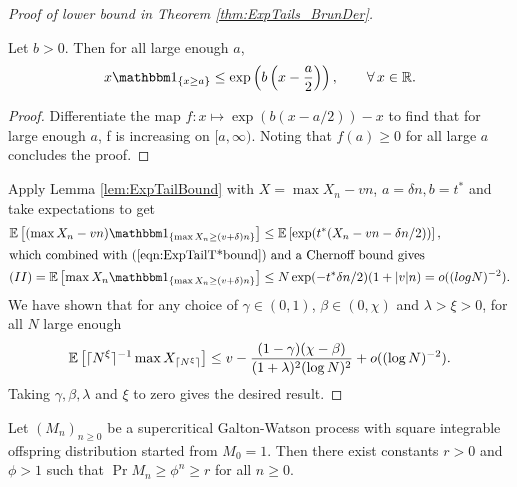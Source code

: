 \begin{proof}[Proof of lower bound in Theorem \ref{thm:ExpTails_BrunDer}]
\begin{lemma} \label{lem:ExpTailBound}
Let $b > 0$. Then for all large enough $a$, 
\begin{equation}
x \Ind_{\{x \geq a\}} \leq \exp\left(b\left(x - \frac{a}{2}\right)\right), \qquad\forall\, x \in \R. 
\end{equation}
\end{lemma}
\begin{proof}
Differentiate the map $f:x \mapsto \exp(b(x - a/2)) - x$ to find that for large enough $a$, f is increasing on $[a, \infty)$. Noting that $f(a) \geq 0$ for all large $a$ concludes the proof.  
\end{proof}
Apply Lemma \ref{lem:ExpTailBound} with $X = \max X_n - vn$, $a = \delta n, b = t^*$ and take expectations to get 
\begin{align*}
\Ex{(\max X_n - vn) \Ind_{\{\max X_n \geq (v + \delta)n\}}} &\leq \Ex{\exp(t^*(X_n - vn - \delta n / 2))}, \nonumber \\
\intertext{which combined with (\ref{eqn:ExpTailT*bound}) and a Chernoff bound gives}
(II) = \Ex{\max X_n \Ind_{\{\max X_n \geq (v + \delta)n\}}} &\leq N \exp(-t^* \delta n /2) (1 + |v|n) = o((log N)^{-2}). 
\end{align*}
We have shown that for any choice of $\gamma \in (0,1)$, $\beta \in (0, \chi)$ and $\lambda > \xi > 0$, for all $N$ large enough
\begin{equation}\label{eqn:ExpTailResultTally}
\mathbb{E}\left[ \lceil N^\xi\rceil^{-1} \max X_{\lceil N^\xi\rceil} \right] \leq v - \frac{(1 - \gamma)(\chi - \beta)}{(1 + \lambda)^2(\log N)^2} + o((\log N)^{-2}). 
\end{equation}
Taking $\gamma, \beta, \lambda$ and $\xi$ to zero gives the desired result. 
\end{proof}

\begin{lemma}\label{lem:ExpTailsGW}
Let $(M_n)_{n \geq 0}$ be a supercritical Galton-Watson process with square integrable offspring distribution started from $M_0 = 1$. Then there exist constants $r > 0$ and $\phi > 1$ such that $\Pr{M_n \geq \phi^n} \geq r$ for all $n \geq 0$. 
\end{lemma}

